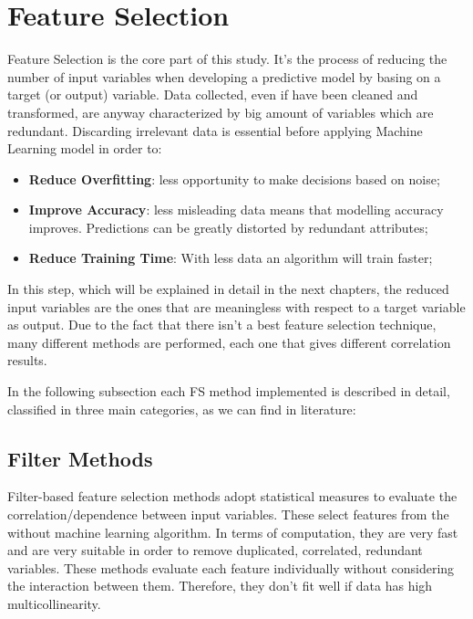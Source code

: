 \section{Feature Selection}
Feature Selection is the core part of this study. It's the process of reducing the number of input variables when developing a predictive model by basing on a target (or output) variable. 
Data collected, even if have been cleaned and transformed, are anyway characterized by big amount of variables which are redundant.
Discarding irrelevant data is essential before applying Machine Learning model in order to:
\begin{itemize}
\item \textbf{Reduce Overfitting}: less opportunity to make decisions based on noise;
\item \textbf{Improve Accuracy}: less misleading data means that modelling accuracy improves. Predictions can be greatly distorted by redundant attributes;
\item \textbf{Reduce Training Time}: With less data an algorithm will train faster;
\end{itemize}
In this step, which will be explained in detail in the next chapters, the reduced input variables are the ones that are meaningless with respect to a target variable as output. \newline
Due to the fact that there isn’t a best feature selection technique, many different methods are performed, each one that gives different correlation results.\par
In the following subsection each FS method implemented is described in detail, classified in three main categories\cite{stanczyk2015feature}, as we can find in literature:
\subsection{Filter Methods}
Filter-based feature selection methods adopt statistical measures to evaluate the correlation/dependence between input variables.\newline
These select features from the without machine learning algorithm. In terms of computation, they are very fast and are very suitable in order to remove duplicated, correlated, redundant variables\cite{saeys2007review}. \newline
These methods evaluate each feature individually without considering the interaction between them. Therefore, they don't fit well if data has high multicollinearity\cite{daoud2017multicollinearity}.

